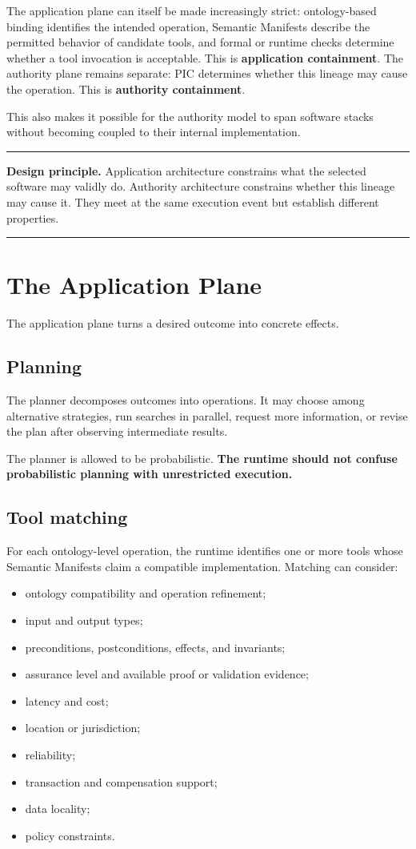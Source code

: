 \documentclass[10pt,oneside,openany]{book}
\newcommand{\term}[1]{\textbf{#1}}
\newcommand{\principle}[1]{%
  \vspace{4pt}
  \noindent\begin{minipage}{\linewidth}
  \hrule\vspace{5pt}
  \small\sffamily\raggedright\textbf{Design principle.} #1
  \vspace{5pt}\hrule
  \end{minipage}\vspace{4pt}
}
\begin{document}
The application plane can itself be made increasingly strict: ontology-based binding identifies the intended operation, Semantic Manifests describe the permitted behavior of candidate tools, and formal or runtime checks determine whether a tool invocation is acceptable. This is \term{application containment}. The authority plane remains separate: PIC determines whether this lineage may cause the operation. This is \term{authority containment}.

This also makes it possible for the authority model to span software stacks without becoming coupled to their internal implementation.

\principle{Application architecture constrains what the selected software may validly do. Authority architecture constrains whether this lineage may cause it. They meet at the same execution event but establish different properties.}

\chapter{The Application Plane}

The application plane turns a desired outcome into concrete effects.

\section{Planning}
The planner decomposes outcomes into operations. It may choose among alternative strategies, run searches in parallel, request more information, or revise the plan after observing intermediate results.

The planner is allowed to be probabilistic. \textbf{The runtime should not confuse probabilistic planning with unrestricted execution.}

\section{Tool matching}
For each ontology-level operation, the runtime identifies one or more tools whose Semantic Manifests claim a compatible implementation. Matching can consider:

\begin{itemize}
\item ontology compatibility and operation refinement;
\item input and output types;
\item preconditions, postconditions, effects, and invariants;
\item assurance level and available proof or validation evidence;
\item latency and cost;
\item location or jurisdiction;
\item reliability;
\item transaction and compensation support;
\item data locality;
\item policy constraints.
\end{itemize}
\end{document}
